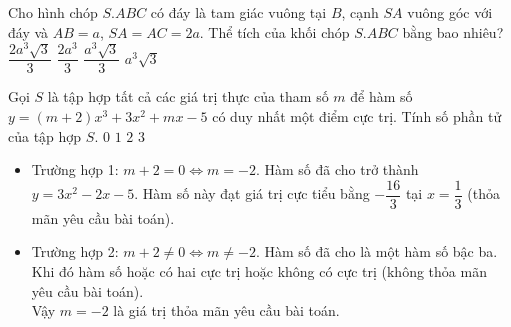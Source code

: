 \begin{ex}%
Cho hình chóp $S.ABC$ có đáy là tam giác vuông tại $B$, cạnh $SA$ vuông góc với đáy và $AB=a$, $SA = AC = 2a$. Thể tích của khối chóp $S.ABC$ bằng bao nhiêu?
 \choice
  {$\dfrac{2a^3\sqrt{3}}{3}$}
  {$\dfrac{2a^3}{3}$}
  {\True $\dfrac{a^3\sqrt{3}}{3}$}
  {$a^3\sqrt{3}$}
 \loigiai
  {
  {
  }
  }
\end{ex}



\begin{ex}%
Gọi $S$ là tập hợp tất cả các giá trị thực của tham số $m$ để hàm số $y=(m+2)x^3+3x^2+mx-5$ có duy nhất một điểm cực trị. Tính số phần tử của tập hợp $S$.
 \choice
  {$0$}
  {\True $1$}
  {$2$}
  {$3$}
 \loigiai
  {
  \begin{itemize}
   \item Trường hợp 1: $m+2=0 \Leftrightarrow m=-2$. Hàm số đã cho trở thành $y=3x^2-2x-5$. Hàm số này đạt giá trị cực tiểu bằng $-\dfrac{16}{3}$ tại $x=\dfrac{1}{3}$ (thỏa mãn yêu cầu bài toán).
   \item Trường hợp 2: $m+2\neq 0 \Leftrightarrow m \neq -2$. Hàm số đã cho là một hàm số bậc ba. Khi đó hàm số hoặc có hai cực trị hoặc không có cực trị (không thỏa mãn yêu cầu bài toán).\\
   Vậy $m=-2$ là giá trị thỏa mãn yêu cầu bài toán.
  \end{itemize}
  }
\end{ex}




